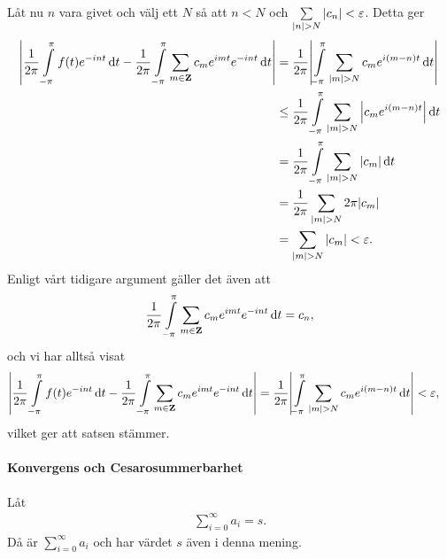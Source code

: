 Låt nu $n$ vara givet och välj ett $N$ så att $n < N$ och $\sum\limits_{\abs{n} > N}\abs{c_{n}} < \varepsilon$. Detta ger
\begin{align*}
	\abs{\frac{1}{2\pi}\int\limits_{-\pi}^{\pi}f(t)e^{-int}\dd{t} - \frac{1}{2\pi}\int\limits_{-\pi}^{\pi}\sum\limits_{m\in\mathbf{Z}}c_{m}e^{imt}e^{-int}\dd{t}} &= \frac{1}{2\pi}\abs{\int\limits_{-\pi}^{\pi}\sum\limits_{\abs{m} > N}c_{m}e^{i(m - n)t}\dd{t}} \\
	                                      &\leq \frac{1}{2\pi}\int\limits_{-\pi}^{\pi}\sum\limits_{\abs{m} > N}\abs{c_{m}e^{i(m - n)t}}\dd{t} \\
	                                      &= \frac{1}{2\pi}\int\limits_{-\pi}^{\pi}\sum\limits_{\abs{m} > N}\abs{c_{m}}\dd{t} \\
	                                      &= \frac{1}{2\pi}\sum\limits_{\abs{m} > N}2\pi\abs{c_{m}} \\
	                                      &= \sum\limits_{\abs{m} > N}\abs{c_{m}} < \varepsilon.
\end{align*}
Enligt vårt tidigare argument gäller det även att
\begin{align*}
	\frac{1}{2\pi}\int\limits_{-\pi}^{\pi}\sum\limits_{m\in\mathbf{Z}}c_{m}e^{imt}e^{-int}\dd{t} = c_{n},
\end{align*}
och vi har alltså visat
\begin{align*}
	\abs{\frac{1}{2\pi}\int\limits_{-\pi}^{\pi}f(t)e^{-int}\dd{t} - \frac{1}{2\pi}\int\limits_{-\pi}^{\pi}\sum\limits_{m\in\mathbf{Z}}c_{m}e^{imt}e^{-int}\dd{t}} &= \frac{1}{2\pi}\abs{\int\limits_{-\pi}^{\pi}\sum\limits_{\abs{m} > N}c_{m}e^{i(m - n)t}\dd{t}} < \varepsilon,
\end{align*}
vilket ger att satsen stämmer.

\paragraph{Konvergens och Cesarosummerbarhet}
Låt
\begin{align*}
	\sum\limits_{i = 0}^{\infty}a_{i} = s.
\end{align*}
Då är $\sum\limits_{i = 0}^{\infty}a_{i}$ och har värdet $s$ även i denna mening.

